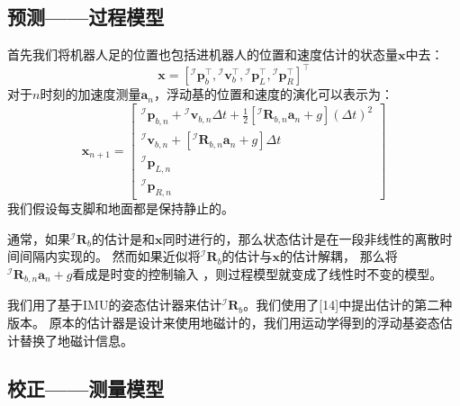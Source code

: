 \subsection{预测——过程模型}

首先我们将机器人足的位置也包括进机器人的位置和速度估计的状态量$\boldsymbol{x}$中去：
\begin{equation}
    \label{equ:est_posvel}
    \boldsymbol{x}=\left[{ }^\mathcal{I} \boldsymbol{p}_b^{\top},{ }^\mathcal{I} \boldsymbol{v}_b^{\top},{ }^\mathcal{I} \boldsymbol{p}_L^{\top},{ }^\mathcal{I} \boldsymbol{p}_R^{\top}\right]^{\top}
\end{equation}
对于$n$时刻的加速度测量$\boldsymbol{a}_n$，浮动基的位置和速度的演化可以表示为：
\begin{equation}
    \label{equ:est_posvel}
    \boldsymbol{x}_{n+1}=\left[\begin{array}{c}
        { }^{\mathcal{I}} \boldsymbol{p}_{b, n}+{ }^{\mathcal{I}} \boldsymbol{v}_{b, n} \Delta t+\frac{1}{2}\left[{ }^{\mathcal{I}} \boldsymbol{R}_{b, n} \boldsymbol{a}_n+g\right](\Delta t)^2 \\
        { }^{\mathcal{I}} \boldsymbol{v}_{b, n}+\left[{ }^{\mathcal{I}} \boldsymbol{R}_{b, n} \boldsymbol{a}_n+g\right] \Delta t \\
        { }^{\mathcal{I}} \boldsymbol{p}_{L, n} \\
        { }^{\mathcal{I}} \boldsymbol{p}_{R, n}
        \end{array}\right]
\end{equation}
我们假设每支脚和地面都是保持静止的。

通常，如果${ }^{\mathcal{I}} \boldsymbol{R}_{b}$的估计是和$\boldsymbol{x}$同时进行的，那么状态估计是在一段非线性的离散时间间隔内实现的。
然而如果近似将${ }^{\mathcal{I}} \boldsymbol{R}_{b}$的估计与$\boldsymbol{x}$的估计解耦，
那么将${ }^{\mathcal{I}} \boldsymbol{R}_{b, n} \boldsymbol{a}_n+g$看成是时变的控制输入 ，则过程模型就变成了线性时不变的模型。

我们用了基于IMU的姿态估计器来估计${ }^{\mathcal{I}} \boldsymbol{R}_{b}$。我们使用了[14]中提出估计的第二种版本。
原本的估计器是设计来使用地磁计的，我们用运动学得到的浮动基姿态估计替换了地磁计信息。

\subsection{校正——测量模型}

